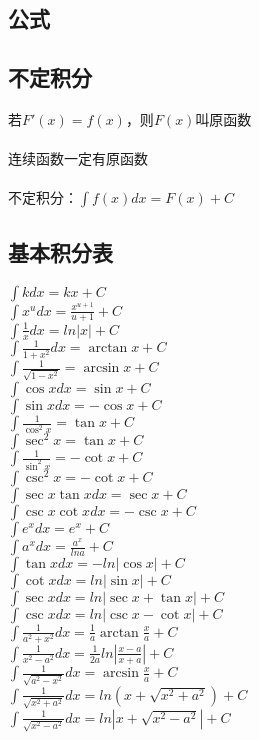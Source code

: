 \documentclass{article}
\begin{document}
\begin{flushleft}
	\LARGE
	
	\section{公式}
	
	\subsection{不定积分}
	
	若$F'(x)=f(x)$，则$F(x)$叫原函数\\
	~\\
	连续函数一定有原函数\\
	~\\
	不定积分：$\int f(x)dx=F(x)+C$\\
	
	\subsection{基本积分表}
	
	$\int kdx=kx+C$\\
	$\int x^udx=\frac{x^{u+1}}{u+1}+C$\\
	$\int \frac{1}{x}dx=ln|x|+C$\\
	$\int \frac{1}{1+x^2}dx=\arctan x+C$\\
	$\int \frac{1}{\sqrt{1-x^2}}=\arcsin x+C$\\
	$\int \cos xdx=\sin x+C$\\
	$\int \sin xdx=-\cos x+C$\\
	$\int \frac{1}{\cos^2x}=\tan x+C$\\
	$\int \sec^2x=\tan x+C$\\
	$\int \frac{1}{\sin^2x}=-\cot x+C$\\
	$\int \csc^2x=-\cot x+C$\\
	$\int \sec x\tan xdx=\sec x+C$\\
	$\int \csc x\cot xdx=-\csc x+C$\\
	$\int e^xdx=e^x+C$\\
	$\int a^xdx=\frac{a^x}{lna}+C$\\
	$\int \tan xdx=-ln|\cos x|+C$\\
	$\int \cot xdx=ln|\sin x|+C$\\
	$\int \sec xdx=ln|\sec x+\tan x|+C$\\
	$\int \csc xdx=ln|\csc x-\cot x|+C$\\
	$\int \frac{1}{a^2+x^2}dx=\frac{1}{a}\arctan \frac{x}{a}+C$\\
	$\int \frac{1}{x^2-a^2}dx=\frac{1}{2a}ln|\frac{x-a}{x+a}|+C$\\
	$\int \frac{1}{\sqrt{a^2-x^2}}dx=\arcsin \frac{x}{a}+C$\\
	$\int \frac{1}{\sqrt{x^2+a^2}}dx=ln(x+\sqrt{x^2+a^2})+C$\\
	$\int \frac{1}{\sqrt{x^2-a^2}}dx=ln|x+\sqrt{x^2-a^2}|+C$\\
	

\end{flushleft}
\end{document}
